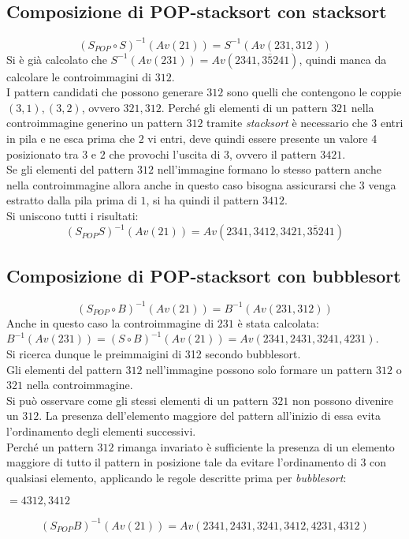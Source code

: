 \subsection*{Composizione di {POP-stacksort} con {stacksort}}
$$(S_{POP}\circ{S})^{-1}(Av(21))=S^{-1}(Av(231,312))$$
Si \`e gi\`a calcolato che $S^{-1}(Av(231))=Av(2341, 3\overline{5}241)$, quindi manca da calcolare le controimmagini di $312$.\\
I pattern candidati che possono generare $312$ sono quelli che contengono le coppie $(3,1),(3,2)$, ovvero $321, 312$.
Perch\'e gli elementi di un pattern $321$ nella controimmagine generino un pattern $312$ tramite \textit{stacksort} \`e necessario che $3$ entri in pila e ne esca prima che $2$ vi entri, deve quindi essere presente un valore $4$ posizionato tra $3$ e $2$ che provochi l'uscita di $3$, ovvero il pattern $3421$.\\
Se gli elementi del pattern $312$ nell'immagine formano lo stesso pattern anche nella controimmagine allora anche in questo caso bisogna assicurarsi che $3$ venga estratto dalla pila prima di $1$, si ha quindi il pattern $3412$.\\Si uniscono tutti i risultati:
$$(S_{POP}S)^{-1}(Av(21))=Av(2341, 3412, 3421, 3\overline{5}241)$$
\subsection*{Composizione di {POP-stacksort} con {bubblesort}}
$$(S_{POP}\circ{B})^{-1}(Av(21))=B^{-1}(Av(231,312))$$
Anche in questo caso la controimmagine di $231$ \`e stata calcolata: $B^{-1}(Av(231)) = (S\circ{B})^{-1}(Av(21)) = Av(2341, 2431, 3241, 4231)$.\\
Si ricerca dunque le preimmaigini di 312 secondo bubblesort. \\
Gli elementi del pattern $312$ nell'immagine possono solo formare un pattern $312$ o $321$ nella controimmagine.\\
Si pu\`o osservare come gli stessi elementi di un pattern $321$ non possono divenire un $312$. La presenza dell'elemento maggiore del pattern all'inizio di essa evita l'ordinamento degli elementi successivi.\\
Perch\'e un pattern $312$ rimanga invariato \`e sufficiente la presenza di un elemento maggiore di tutto il pattern in posizione tale da evitare l'ordinamento di $3$ con qualsiasi elemento, applicando le regole descritte prima per \textit{bubblesort}: 
\begin{center}
$=4312,3412$
\end{center}
$$(S_{POP}{B})^{-1}(Av(21))=Av(2341, 2431, 3241, 3412, 4231, 4312)$$
